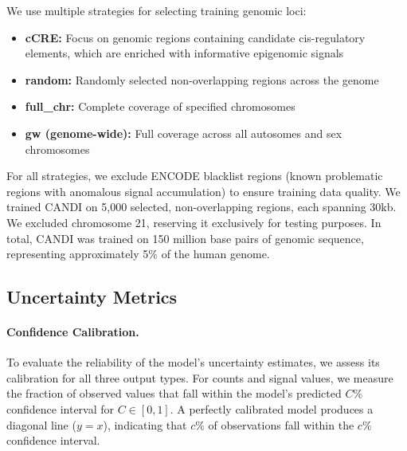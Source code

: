 We use multiple strategies for selecting training genomic loci:
\begin{itemize}
    \item \textbf{cCRE:} Focus on genomic regions containing candidate cis-regulatory elements, which are enriched with informative epigenomic signals \cite{encode2020expanded}
    \item \textbf{random:} Randomly selected non-overlapping regions across the genome
    \item \textbf{full\_chr:} Complete coverage of specified chromosomes
    \item \textbf{gw (genome-wide):} Full coverage across all autosomes and sex chromosomes
\end{itemize}

For all strategies, we exclude ENCODE blacklist regions (known problematic regions with anomalous signal accumulation) to ensure training data quality. We trained CANDI on 5,000 selected, non-overlapping regions, each spanning 30kb. We excluded chromosome 21, reserving it exclusively for testing purposes. In total, CANDI was trained on 150 million base pairs of genomic sequence, representing approximately 5\% of the human genome.

\subsection{Uncertainty Metrics}

\paragraph{Confidence Calibration.}
To evaluate the reliability of the model's uncertainty estimates, we assess its calibration for all three output types. For counts and signal values, we measure the fraction of observed values that fall within the model's predicted $C\%$ confidence interval for $C \in [0, 1]$. A perfectly calibrated model produces a diagonal line ($y = x$), indicating that $c\%$ of observations fall within the $c\%$ confidence interval.

